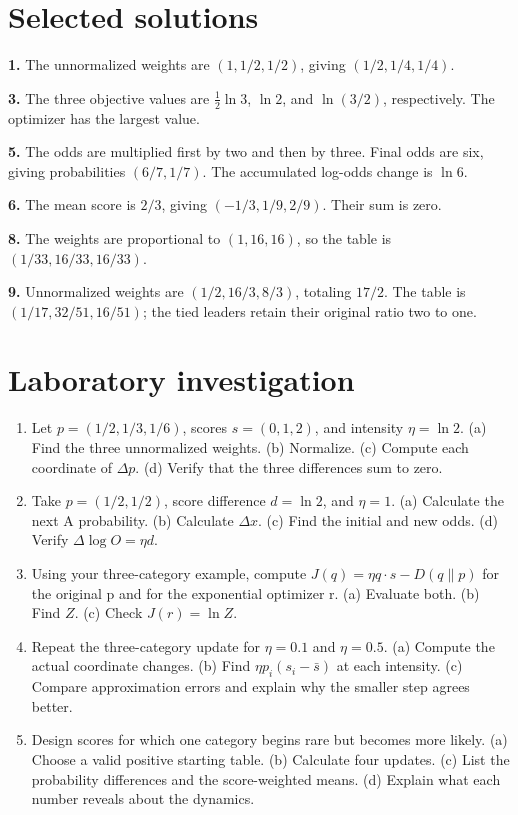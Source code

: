 \documentclass[11pt,oneside,openany]{book}
\theoremstyle{definition}
\theoremstyle{remark}
\numberwithin{equation}{chapter}
\providecommand{\tightlist}{\setlength{\itemsep}{0pt}\setlength{\parskip}{0pt}}
\newcommand{\labheading}{\FloatBarrier\section*{Laboratory investigation}\addcontentsline{toc}{section}{Laboratory investigation}}
\begin{document}
\section{Selected solutions}\label{ch09-selected-solutions}

\textbf{1.} The unnormalized weights are \((1,1/2,1/2)\), giving \((1/2,1/4,1/4)\).

\textbf{3.} The three objective values are \(\tfrac12\ln3\), \(\ln2\), and \(\ln(3/2)\), respectively. The optimizer has the largest value.

\textbf{5.} The odds are multiplied first by two and then by three. Final odds are six, giving probabilities \((6/7,1/7)\). The accumulated log-odds change is \(\ln6\).

\textbf{6.} The mean score is \(2/3\), giving \((-1/3,1/9,2/9)\). Their sum is zero.

\textbf{8.} The weights are proportional to \((1,16,16)\), so the table is \((1/33,16/33,16/33)\).

\textbf{9.} Unnormalized weights are \((1/2,16/3,8/3)\), totaling \(17/2\). The table is \((1/17,32/51,16/51)\); the tied leaders retain their original ratio two to one.
\labheading\begin{enumerate}
\def\labelenumi{\arabic{enumi}.}
\tightlist
\item
  Let \(p=(1/2,1/3,1/6)\), scores \(s=(0,1,2)\), and intensity \(\eta=\ln2\). (a) Find the three unnormalized weights. (b) Normalize. (c) Compute each coordinate of \(\Delta p\). (d) Verify that the three differences sum to zero.
\item
  Take \(p=(1/2,1/2)\), score difference \(d=\ln2\), and \(\eta=1\). (a) Calculate the next A probability. (b) Calculate \(\Delta x\). (c) Find the initial and new odds. (d) Verify \(\Delta\log O=\eta d\).
\item
  Using your three-category example, compute \(J(q)=\eta q\cdot s-D(q\|p)\) for the original p and for the exponential optimizer r. (a) Evaluate both. (b) Find \(Z\). (c) Check \(J(r)=\ln Z\).
\item
  Repeat the three-category update for \(\eta=0.1\) and \(\eta=0.5\). (a) Compute the actual coordinate changes. (b) Find \(\eta p_i(s_i-\bar s)\) at each intensity. (c) Compare approximation errors and explain why the smaller step agrees better.
\item
  Design scores for which one category begins rare but becomes more likely. (a) Choose a valid positive starting table. (b) Calculate four updates. (c) List the probability differences and the score-weighted means. (d) Explain what each number reveals about the dynamics.
\end{enumerate}
\end{document}
